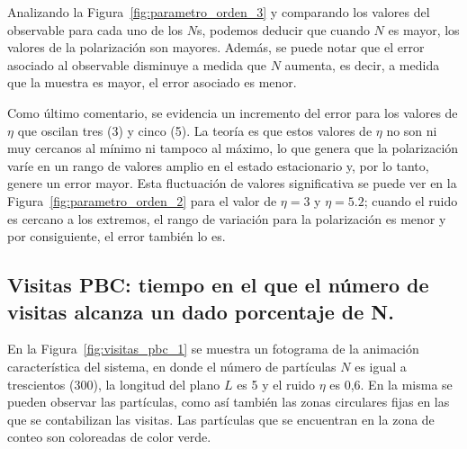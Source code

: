 \documentclass[11pt, a4paper]{article}
\begin{document}
            Analizando la Figura~\ref{fig:parametro_orden_3} y comparando los valores del observable para cada uno de los $N$s, podemos deducir que
            cuando $N$ es mayor, los valores de la polarización son mayores.
            Además, se puede notar que el error asociado al observable disminuye a medida que $N$ aumenta, es decir, a
            medida que la muestra es mayor, el error asociado es menor.

            Como último comentario, se evidencia un incremento del error para los valores de $\eta$ que oscilan tres (3) y cinco (5).
            La teoría es que estos valores de $\eta$ no son ni muy cercanos al mínimo ni tampoco al máximo, lo que genera que
            la polarización varíe en un rango de valores amplio en el estado estacionario y, por lo tanto, genere un error
            mayor.
            Esta fluctuación de valores significativa se puede ver en la Figura~\ref{fig:parametro_orden_2} para el valor de $\eta = 3$ y
            $\eta = 5.2$; cuando el ruido es cercano a los extremos, el rango de variación para la polarización es menor y por
            consiguiente, el error también lo es.

        \subsection{Visitas PBC: tiempo en el que el número de visitas alcanza un dado porcentaje de N.}
        \label{subsec:resultados-visitas-pbc}

            En la Figura~\ref{fig:visitas_pbc_1} se muestra un fotograma de la animación característica del sistema, en donde
            el número de partículas $N$ es igual a trescientos (300), la longitud del plano $L$ es 5 y el ruido $\eta$ es 0,6.
            En la misma se pueden observar las partículas, como así también las zonas circulares fijas en las que se contabilizan las visitas.
            Las partículas que se encuentran en la zona de conteo son coloreadas de color verde.
\end{document}
